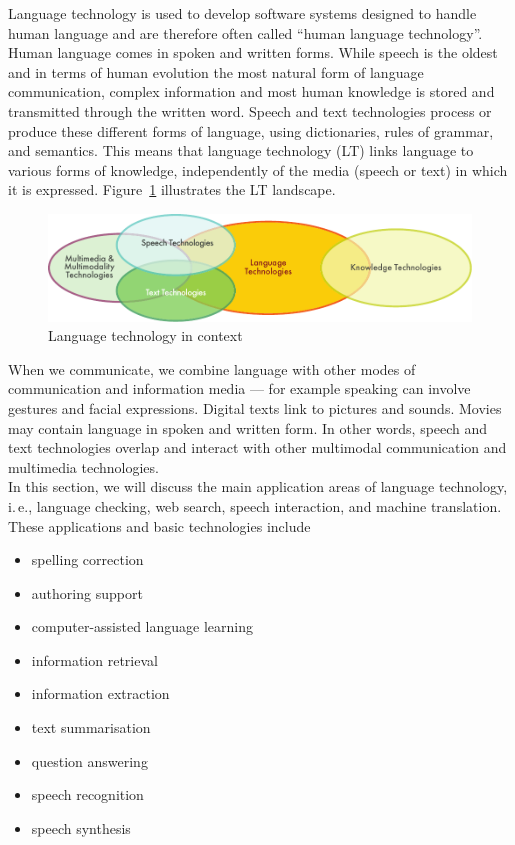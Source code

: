 
\begin{multicols}{2}

Language technology is used to develop software systems designed to
handle human language and are therefore often called ``human language
technology''. Human language comes in spoken and written forms. While
speech is the oldest and in terms of human evolution the most natural
form of language communication, complex information and most human
knowledge is stored and transmitted through the written word. Speech
and text technologies process or produce these different forms of
language, using dictionaries, rules of grammar, and semantics. This
means that language technology (LT) links language to various forms of
knowledge, independently of the media (speech or text) in which it is
expressed. Figure~\ref{fig:ltincontext_en} illustrates the LT
landscape. 

\begin{figure}[htb]
  \center
  \includegraphics[width=\textwidth]{../_media/english/language_technologies}
  \caption{Language technology in context}
  \label{fig:ltincontext_en}
\end{figure}

When we communicate, we combine language with other modes of communication and information media --- for example speaking can involve gestures and facial expressions. Digital texts link to pictures and sounds. Movies may contain language in spoken and written form. In other words, speech and text technologies overlap and interact with other multimodal communication and multimedia technologies.\\ 
In this section, we will discuss the main application areas of language technology, i.\,e., language checking, web search, speech interaction, and machine translation. These applications and basic technologies include 

\begin{itemize}
\item spelling correction
\item authoring support
\item computer-assisted language learning
\item information retrieval 
\item information extraction
\item text summarisation
\item question answering
\item speech recognition 
\item speech synthesis 
\end{itemize}


\end{multicols}
